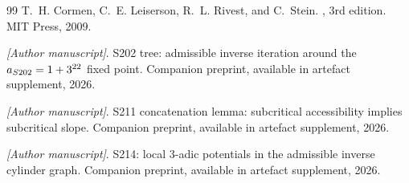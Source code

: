 \documentclass[11pt,a4paper]{article}
\theoremstyle{plain}
\theoremstyle{definition}
\theoremstyle{plain}
\newcommand{\aS}{a_{S202}}
\begin{document}
\begin{thebibliography}{99}
T.~H. Cormen, C.~E. Leiserson, R.~L. Rivest, and C.~Stein.
, 3rd edition.
\newblock MIT Press, 2009.

\emph{[Author manuscript]}.
S202 tree: admissible inverse iteration around the
$\protect\aS = 1+3^{22}$ fixed point.
Companion preprint, available in artefact supplement, 2026.

\emph{[Author manuscript]}.
S211 concatenation lemma: subcritical accessibility
implies subcritical slope.
Companion preprint, available in artefact supplement, 2026.

\emph{[Author manuscript]}.
S214: local 3-adic potentials in the admissible
inverse cylinder graph.
Companion preprint, available in artefact supplement, 2026.

\end{thebibliography}
\end{document}
